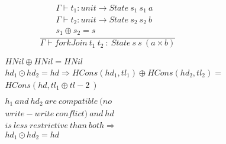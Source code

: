 \documentclass{article}
\begin{document}
$$\frac{ 
		 \begin{array}{ccc}
			\Gamma \vdash t_1:unit\to State\ s_1\ s_1\ a & \\ 
			\Gamma \vdash t_2:unit\to State\ s_2\ s_2\ b & \\ 
			s_1\oplus s_2=s & 
		\end{array}
		}
		{\Gamma \vdash forkJoin\ t_1\ t_2\ :\ State\ s\ s\ (a\times b)}$$

\begin{eqnarray*}
	&&HNil\oplus HNil=HNil 	\\ 
	&&hd_1 \odot hd_2=hd \Rightarrow HCons(hd_1,tl_1) \oplus HCons(hd_2,tl_2) = 	\\ 
&&HCons(hd,tl_1\oplus tl-2\ ) 	\\ 
									\\
&&h_1\ and\ hd_2\ are\ compatible\ (no 		\\ 
&&write-write\ conflict)\ and\ hd 			\\ 
&&is\ less\ restrictive\ than\ both\Rightarrow  			\\ 
&&hd_1\odot hd_2=hd 				\\ 
\end{eqnarray*}
\end{document}
